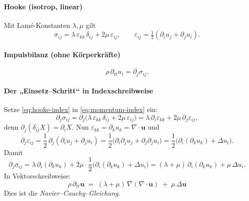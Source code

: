 \paragraph{Hooke (isotrop, linear)}
Mit Lamé-Konstanten $\lambda,\mu$ gilt
\begin{equation}
  \sigma_{ij} = \lambda\,\varepsilon_{kk}\,\delta_{ij} + 2\mu\,\varepsilon_{ij},
  \qquad
  \varepsilon_{ij} = \tfrac12(\partial_i u_j + \partial_j u_i).
  \label{eq:hooke-index}
\end{equation}

\paragraph{Impulsbilanz (ohne Körperkräfte)}
\begin{equation}
  \rho\,\partial_{tt} u_i = \partial_j \sigma_{ij}.
  \label{eq:momentum-index}
\end{equation}

\paragraph{Der „Einsetz–Schritt“ in Indexschreibweise}
Setze \eqref{eq:hooke-index} in \eqref{eq:momentum-index} ein:
\[
    \partial_j \sigma_{ij}
    = \partial_j\!\big(\lambda\,\varepsilon_{kk}\,\delta_{ij} + 2\mu\,\varepsilon_{ij}\big)
    = \lambda\,\partial_i \varepsilon_{kk} + 2\mu\,\partial_j \varepsilon_{ij},
\]
denn $\partial_j(\delta_{ij}X)=\partial_i X$.
Nun $\varepsilon_{kk} = \partial_k u_k = \nabla\!\cdot\!\mathbf{u}$ und
\[
    \partial_j \varepsilon_{ij}
    = \frac12\,\partial_j(\partial_i u_j + \partial_j u_i)
    = \frac12\big(\partial_i\partial_j u_j + \partial_j\partial_j u_i\big)
    = \frac12\big(\partial_i(\partial_k u_k) + \Delta u_i\big).
\]
Damit
\[
    \partial_j \sigma_{ij}
    = \lambda\,\partial_i(\partial_k u_k) + 2\mu\cdot \frac12\big(\partial_i(\partial_k u_k) + \Delta u_i\big)
    = (\lambda+\mu)\,\partial_i(\partial_k u_k) + \mu\,\Delta u_i.
\]
In Vektorschreibweise:
\begin{equation}
    \boxed{\,\rho\,\partial_{tt}\mathbf{u} \;=\; (\lambda+\mu)\,\nabla(\nabla\!\cdot\!\mathbf{u}) \;+\; \mu\,\Delta \mathbf{u}\,}
    \label{eq:navier}
\end{equation}
Dies ist die \emph{Navier–Cauchy–Gleichung}.


